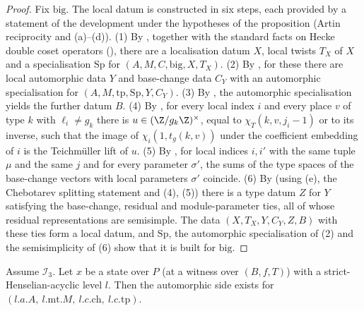 \begin{proof}
Fix $\mathrm{big}$. The local datum is constructed in six steps, each provided by a statement of the
development under the hypotheses of the proposition (Artin reciprocity and (a)--(d)).
(1) By , together with the standard facts on Hecke
double coset operators (), there are a localisation datum
$X$, local twists $T_X$ of $X$ and a specialisation $\mathrm{Sp}$ for $(A,M,C,\mathrm{big},X,T_X)$.
(2) By , for these there are local automorphic data $Y$
and base-change data $C_Y$ with an automorphic specialisation for $(A,M,\mathrm{tp},\mathrm{Sp},Y,C_Y)$.
(3) By , the automorphic specialisation yields the
further datum $B$.
(4) By , for every local index $i$ and every place
$v$ of type $k$ with $\ell_i\neq g_k$ there is $u\in(\Z/g_k\Z)^\times$, equal to $\chi_T(k,v,j_i-1)$ or to its inverse,
such that the image of $\chi_i(1,t_g(k,v))$ under the coefficient embedding of $i$ is the Teichm\"uller lift of $u$.
(5) By , for local indices $i,i'$ with the
same tuple $\mu$ and the same $j$ and for every parameter $\sigma'$, the sums of the type spaces of the
base-change vectors with local parameters $\sigma'$ coincide.
(6) By  (using (e), the Chebotarev splitting statement and
(4), (5)) there is a type datum $Z$ for $Y$ satisfying the base-change, residual and module-parameter ties,
all of whose residual representations are semisimple.
The data $(X,T_X,Y,C_Y,Z,B)$ with these ties form a local datum, and $\mathrm{Sp}$, the automorphic
specialisation of (2) and the semisimplicity of (6) show that it is built for $\mathrm{big}$.
\end{proof}

\begin{corollary}\label{pf:baselat2:builtex}
Assume $\mathcal I_3$. Let $x$ be a state over $P$ (at a witness over $(B,f,T)$) with a
strict-Henselian-acyclic level $l$. Then the automorphic side exists for
$(l.a.A,\ l.\mathrm{mt}.M,\ l.c.\mathrm{ch},\ l.c.\mathrm{tp})$.
\end{corollary}

